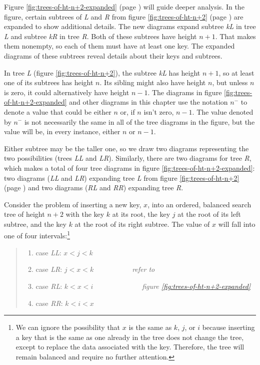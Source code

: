 Figure \ref{fig:trees-of-ht-n+2-expanded} (page \pageref{fig:trees-of-ht-n+2-expanded})
will guide deeper analysis.
In the figure, certain subtrees of \emph{L} and \emph{R} from
figure \ref{fig:trees-of-ht-n+2} (page \pageref{fig:trees-of-ht-n+2})
are expanded to show additional details.
The new diagrams expand subtree
\emph{kL} in tree \emph{L} and subtree \emph{kR} in tree \emph{R}.
Both of these subtrees have height $n+1$.
That makes them nonempty, so each of them must have at least one key.
The expanded diagrams of these subtrees
reveal details about their keys and subtrees.

In tree \emph{L} (figure \ref{fig:trees-of-ht-n+2}),
the subtree \emph{kL} has height $n+1$,
so at least one of its subtrees has height $n$.
Its sibling might also have height $n$, but unless $n$ is zero,
it could alternatively have height $n-1$.
The diagrams in figure \ref{fig:trees-of-ht-n+2-expanded}
and other diagrams in this chapter
use the notation $n^-$
to denote a value that could be either $n$
or, if $n$ isn't zero, $n-1$.
The value denoted by $n^-$ is not necessarily the same
in all of the tree diagrams in the figure,
but the value will be, in every instance,
either $n$ or $n-1$.

Either subtree may be the taller one,
so we draw two diagrams representing the two possibilities
(trees \emph{LL} and \emph{LR}).
Similarly, there are two diagrams for tree \emph{R},
which makes a total of four tree diagrams in
figure \ref{fig:trees-of-ht-n+2-expanded}:
two diagrams (\emph{LL} and \emph{LR})
expanding tree \emph{L} from
figure \ref{fig:trees-of-ht-n+2} (page \pageref{fig:trees-of-ht-n+2})
and two diagrams (\emph{RL} and \emph{RR}) expanding tree \emph{R}.

Consider the problem of inserting a new key, $x$, into
an ordered, balanced search tree of height $n+2$ with the key $k$
at its root, the key $j$ at the root of its left subtree,
and the key $k$ at the root of its right subtree.
The value of $x$ will fall into one of four intervals:\footnote{We
can ignore the possibility that $x$ is the same as
$k$, $j$, or $i$ because
inserting a key that is the same as one already in the
tree does not change the tree,
except to replace the data associated with the key.
Therefore, the tree will remain balanced and
require no further attention.}
\label{cases:ht-n+2}\begin{quote}
\begin{enumerate}
\item case \emph{LL}: $x < j < k$
\item case \emph{LR}: $j < x < k$~~~~~~~~~~~\emph{refer to }
\item case \emph{RL}: $k < x < i$~~~~~~~~~~~~~~\emph{figure \ref{fig:trees-of-ht-n+2-expanded}}
\item case \emph{RR}: $k < i < x$
\end{enumerate}
\end{quote}

